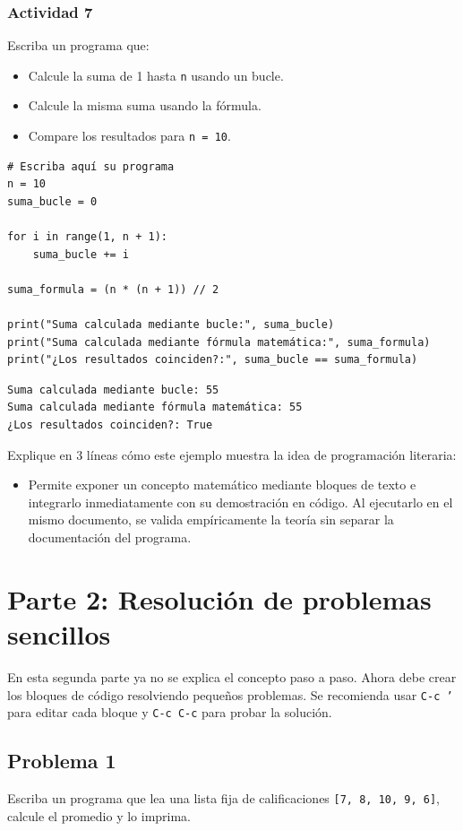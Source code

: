 \documentclass{article}
\begin{document}
\subsubsection{Actividad 7}
\label{sec:org7cf49d4}
Escriba un programa que:
\begin{itemize}
\item Calcule la suma de 1 hasta \texttt{n} usando un bucle.
\item Calcule la misma suma usando la fórmula.
\item Compare los resultados para \texttt{n = 10}.
\end{itemize}

\begin{verbatim}
# Escriba aquí su programa
n = 10
suma_bucle = 0

for i in range(1, n + 1):
    suma_bucle += i
    
suma_formula = (n * (n + 1)) // 2

print("Suma calculada mediante bucle:", suma_bucle)
print("Suma calculada mediante fórmula matemática:", suma_formula)
print("¿Los resultados coinciden?:", suma_bucle == suma_formula)
\end{verbatim}

\begin{verbatim}
Suma calculada mediante bucle: 55
Suma calculada mediante fórmula matemática: 55
¿Los resultados coinciden?: True
\end{verbatim}


Explique en 3 líneas cómo este ejemplo muestra la idea de programación literaria:
\begin{itemize}
\item Permite exponer un concepto matemático mediante bloques de texto e integrarlo inmediatamente con su demostración en código. Al ejecutarlo en el mismo documento, se valida empíricamente la teoría sin separar la documentación del programa.
\end{itemize}

\section{Parte 2: Resolución de problemas sencillos}
\label{sec:orgc2d7090}
En esta segunda parte ya no se explica el concepto paso a paso. Ahora debe crear los bloques de código resolviendo pequeños problemas. Se recomienda usar \texttt{C-c '} para editar cada bloque y \texttt{C-c C-c} para probar la solución.

\subsection{Problema 1}
\label{sec:org8fb72d1}
Escriba un programa que lea una lista fija de calificaciones \texttt{[7, 8, 10, 9, 6]}, calcule el promedio y lo imprima.
\end{document}

